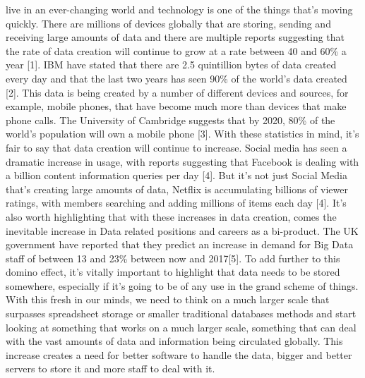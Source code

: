 \documentclass[10pt,journal,compsoc]{IEEEtran}
\begin{document}
 live in an ever-changing world and technology is one of the things that's moving quickly. There are millions of devices globally that are storing, sending and receiving large amounts of data and there are multiple reports suggesting that the rate of data creation will continue to grow at a rate between 40 and 60\% a year [1]. IBM have stated that there are 2.5 quintillion bytes of data created every day and that the last two years has seen 90\% of the world's data created [2]. This data is being created by a number of different devices and sources, for example, mobile phones, that have become much more than devices that make phone calls. The University of Cambridge suggests that by 2020, 80\% of the world’s population will own a mobile phone [3]. With these statistics in mind, it's fair to say that data creation will continue to increase. Social media has seen a dramatic increase in usage, with reports suggesting that Facebook is dealing with a billion content information queries per day [4]. But it's not just Social Media that's creating large amounts of data, Netflix is accumulating billions of viewer ratings, with members searching and adding millions of items each day [4]. It's also worth highlighting that with these increases in data creation, comes the inevitable increase in Data related positions and careers as a bi-product. The UK government have reported that they predict an increase in demand for Big Data staff of between 13 and 23\% between now and 2017[5]. To add further to this domino effect, it's vitally important to highlight that data needs to be stored somewhere, especially if it's going to be of any use in the grand scheme of things. With this fresh in our minds, we need to think on a much larger scale that surpasses spreadsheet storage or smaller traditional databases methods and start looking at something that works on a much larger scale, something that can deal with the vast amounts of data and information being circulated globally. This increase creates a need for better software to handle the data, bigger and better servers to store it and more staff to deal with it.\\
\end{document}
